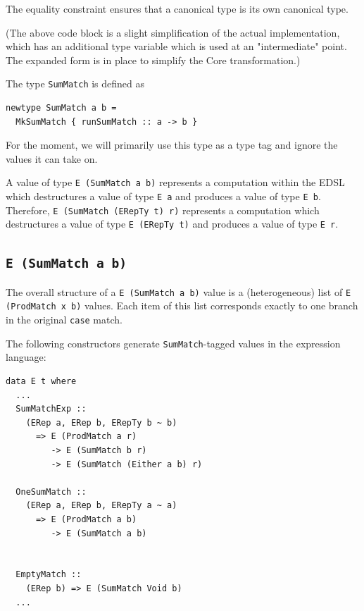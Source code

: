 \documentclass[runningheads, a4paper]{llncs}
\newcommand{\ttt}{\texttt}
\newcommand{\showtodos}{}  %
\newenvironment{todo}
  {\ifthenelse{\isundefined{\showtodos}}{\comment}{\begin{tcolorbox}
    \textbf{TODO}:}}
  {\ifthenelse{\isundefined{\showtodos}}{\endcomment}{\end{tcolorbox}}
  }
\begin{document}
The equality constraint ensures that a canonical type is its own canonical type.


(The above code block is a slight simplification of the actual implementation,
which has an additional type variable which is used at an "intermediate" point.
The expanded form is in place to simplify the Core transformation.)

The type \ttt{SumMatch} is defined as

\begin{lstlisting}
newtype SumMatch a b =
  MkSumMatch { runSumMatch :: a -> b }
\end{lstlisting}

For the moment, we will primarily use this type as a type tag and ignore
the values it can take on.

A value of type \ttt{E (SumMatch a b)} represents a computation within the EDSL
which destructures a value of type \ttt{E a} and produces a value of type \ttt{E b}.
Therefore, \ttt{E (SumMatch (ERepTy t) r)} represents a computation which destructures
a value of type \ttt{E (ERepTy t)} and produces a value of type \ttt{E r}.



\subsection{\ttt{E (SumMatch a b)}}

The overall structure of a \ttt{E (SumMatch a b)} value is a (heterogeneous)
list of \ttt{E (ProdMatch x b)} values.  Each item of this list corresponds
exactly to one branch in the original \ttt{case} match.

The following constructors generate \ttt{SumMatch}-tagged values in the
expression language:

\begin{lstlisting}
data E t where
  ...
  SumMatchExp ::
    (ERep a, ERep b, ERepTy b ~ b)
      => E (ProdMatch a r)
         -> E (SumMatch b r)
         -> E (SumMatch (Either a b) r)

  OneSumMatch ::
    (ERep a, ERep b, ERepTy a ~ a)
      => E (ProdMatch a b)
         -> E (SumMatch a b)


  EmptyMatch ::
    (ERep b) => E (SumMatch Void b)
  ...
\end{lstlisting}
\end{document}
